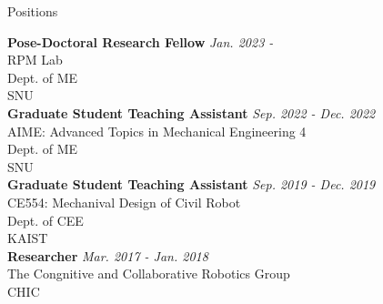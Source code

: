 \begin{rSection}{Positions}

{\bf Pose-Doctoral Research Fellow} \hfill {\em Jan. 2023 -} \\
\acf{RPM} Lab \\ 
Dept. of \acf{ME} \\
\acf{SNU}\\

{\bf Graduate Student Teaching Assistant} \hfill {\em Sep. 2022 - Dec. 2022} \\
AIME: Advanced Topics in Mechanical Engineering 4 \\ 
Dept. of \acf{ME} \\
\acf{SNU}\\

{\bf Graduate Student Teaching Assistant} \hfill {\em Sep. 2019 - Dec. 2019} \\
CE554: Mechanival Design of Civil Robot \\ 
Dept. of \acf{CEE} \\
\acf{KAIST}\\

{\bf Researcher} \hfill {\em Mar. 2017 - Jan. 2018} \\
The Congnitive and Collaborative Robotics Group\\
\acf{CHIC}\\


\end{rSection}

